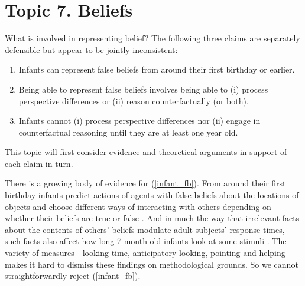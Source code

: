 \documentclass[12pt,\papersize]{extarticle}
\begin{document}
%
%
%


\section{Topic 7. Beliefs}
What is involved in representing belief?
The following three claims are separately defensible but appear to be jointly inconsistent: 
%
\begin{enumerate}
\item Infants can represent false beliefs from around their first birthday or earlier. \label{infant_fb}
%
\item  \label{fb_is_perspectives}  Being able to represent false beliefs involves being able to  (i) process perspective differences or (ii) reason counterfactually (or both).
%
\item Infants cannot (i) process perspective differences nor (ii) engage in counterfactual reasoning until they are at least one year old.  \label{infant_perspectives}
%
\end{enumerate}
%
This topic will first consider evidence and theoretical arguments in support of each claim in turn.  

There is a growing body of evidence for (\ref{infant_fb}).
From around their first birthday infants  predict actions of agents with false beliefs about the locations of objects \citep[]{Onishi:2005hm, Southgate:2007js}
and choose different ways of interacting with others depending on whether their beliefs are true or false \citep[]{Buttelmann:2009gy,Knudsen:2011fk,southgate:2010fb}.  
And in much the way that irrelevant facts about the contents of others’ beliefs modulate adult subjects’ response times, such facts also affect how long 7-month-old infants look at some stimuli \citep[]{kovacs_social_2010}.
The variety of  measures---looking time, anticipatory looking, pointing and helping---makes it hard to dismiss these findings on methodological grounds.
So we cannot straightforwardly reject (\ref{infant_fb}).
\end{document}
